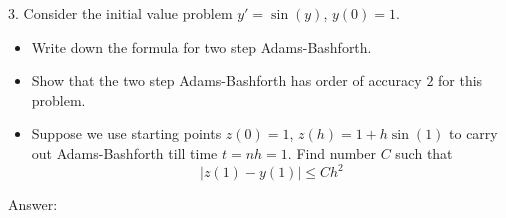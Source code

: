 \documentclass{article} %
\theoremstyle{break}
\begin{document}

3. Consider the initial value problem $y'=\sin(y)$, $y(0)=1$.

\begin{itemize}
\item Write down the formula for two step Adams-Bashforth.
\item Show that the two step Adams-Bashforth has order of accuracy $2$ for this problem.
\item Suppose we use starting points $z(0)=1$, $z(h)=1+h\sin(1)$ to carry out Adams-Bashforth till time $t=nh=1$. Find number $C$ such that
  \[|z(1)-y(1)|\leq Ch^2\]
\end{itemize}

Answer:
\end{document}
